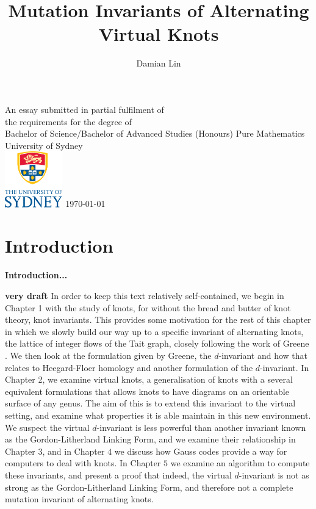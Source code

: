 \documentclass[12pt]{report}
\newcommand{\notered}[1]{{\color{Red} \textbf{#1}}}
\newcommand{\notegreen}[1]{{\color{Green} \textbf{#1}}}
\begin{document}
	

\author{Damian Lin}
\title{Mutation Invariants of Alternating Virtual Knots}

\cleardoublepage \thispagestyle{empty}
\null \vfil
\begingroup
\LARGE \bfseries \centering
\openup \medskipamount
\thetitle \par \vspace{30pt}
\centering \mdseries \theauthor \par \bigskip
\endgroup
\vfil \vfil \vfil
\begin{center}
	An essay submitted in partial fulfilment of\\
	the requirements for the degree of\\
	Bachelor of Science/Bachelor of Advanced Studies (Honours)
	\vfil\vfil
	{\large Pure Mathematics\\[5pt]
		University of Sydney}\\
	\vskip6mm
	\includegraphics[width=25mm]{graphics/USY_MB1_CMYK_Stacked_Logo}
	\vfil
	\normalsize\today
\end{center}
\vfil
\cleardoublepage

\tableofcontents

\chapter*{Introduction}

\notegreen{Introduction...}

\notered{very draft}
In order to keep this text relatively self-contained, we begin in Chapter 1 with the study of knots, for without the bread and butter of knot theory, knot invariants. This provides some motivation for the rest of this chapter in which we slowly build our way up to a specific invariant of alternating knots, the lattice of integer flows of the Tait graph, closely following the work of Greene \cite{lattices-graphs-mutation}. We then look at the formulation given by Greene, the $d$-invariant and how that relates to Heegard-Floer homology and another formulation of the $d$-invariant. In Chapter 2, we examine virtual knots, a generalisation of knots with a several equivalent formulations that allows knots to have diagrams on an orientable surface of any genus. The aim of this is to extend this invariant to the virtual setting, and examine what properties it is able maintain in this new environment. We suspect the virtual $d$-invariant is less powerful than another invariant known as the Gordon-Litherland Linking Form, and we examine their relationship in Chapter $3$, and in Chapter $4$ we discuss how Gauss codes provide a way for computers to deal with knots. In Chapter $5$ we examine an algorithm to compute these invariants, and present a proof that indeed, the virtual $d$-invariant is not as strong as the Gordon-Litherland Linking Form, and therefore not a complete mutation invariant of alternating knots.
\end{document}
